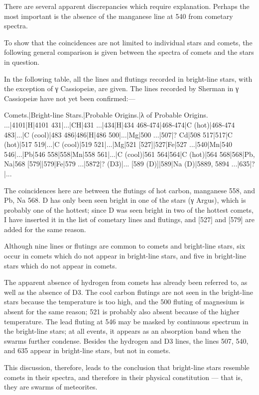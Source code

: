 \documentclass[a4paper, 12pt, oneside, polutonikogreek, english]{article}
\begin{document}
There are several apparent discrepancies which require explanation. Perhaps the most important is the absence of the manganese line at 540 from cometary spectra.

To show that the coincidences are not limited to individual stars and comets, the following general comparison is given between the spectra of comets and the stars in question.

In the following table, all the lines and flutings recorded in bright-line stars, with the exception of γ Cassiopeiæ, are given. The lines recorded by Sherman in γ Cassiopeiæ have not yet been confirmed:---

Comets.|Bright-line Stars.|Probable Origins.|λ of Probable Origins. 
...|4101|H|4101 
431|...|CH|431 
...|434|H|434 
468-474|468-474|C (hot)|468-474 
483|...|C (cool)|483 
486|486|H|486 
500|...|Mg|500 
...|507|? Cd|508 
517|517|C (hot)|517 
519|...|C (cool)|519 
521|...|Mg|521 
[527]|527|Fe|527 
...|540|Mn|540 
546|...|Pb|546 
558|558|Mn|558 
561|...|C (cool)|561 
564|564|C (hot)|564 
568|568|Pb, Na|568 
[579]|579|Fe|579 
...|5872|? (D3)|... 
[589 (D)]|589|Na (D)|5889, 5894 
...|635|?|... 

The coincidences here are between the flutings of hot carbon, manganese 558, and Pb, Na 568. D has only been seen bright in one of the stars (γ Argus), which is probably one of the hottest; since D was seen bright in two of the hottest comets, I have inserted it in the list of cometary lines and flutings, and [527] and [579] are added for the same reason.

Although nine lines or flutings are common to comets and bright-line stars, six occur in comets which do not appear in bright-line stars, and five in bright-line stars which do not appear in comets.

The apparent absence of hydrogen from comets has already been referred to, as well as the absence of D3. The cool carbon flutings are not seen in the bright-line stars because the temperature is too high, and the 500 fluting of magnesium is absent for the same reason; 521 is probably also absent because of the higher temperature. The lead fluting at 546 may be masked by continuous spectrum in the bright-line stars; at all events, it appears as an absorption band when the swarms further condense. Besides the hydrogen and D3 lines, the lines 507, 540, and 635 appear in bright-line stars, but not in comets.

This discussion, therefore, leads to the conclusion that bright-line stars resemble comets in their spectra, and therefore in their physical constitution --- that is, they are swarms of meteorites.
\end{document}
